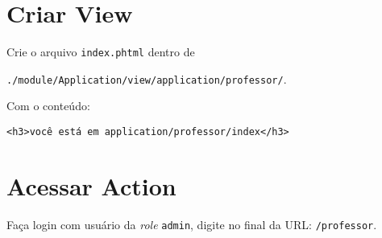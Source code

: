 \section{Criar View}\label{criar-view}

Crie o arquivo \texttt{index.phtml} dentro de

\texttt{./module/Application/view/application/professor/}.

Com o conteúdo:

\begin{verbatim}
<h3>você está em application/professor/index</h3>
\end{verbatim}

\section{Acessar Action}\label{acessar-action}

Faça login com usuário da \emph{role} \texttt{admin}, digite no final da
URL: \texttt{/professor}.

